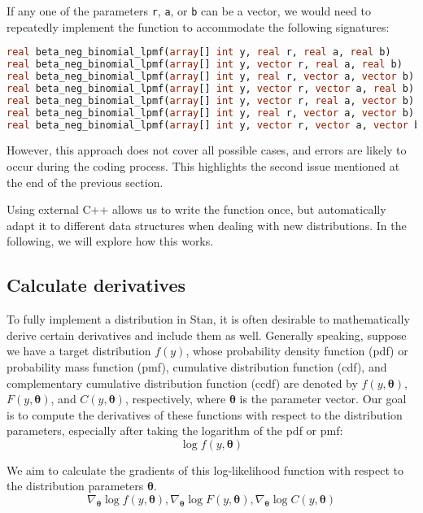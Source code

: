 \documentclass[11pt]{article}
\begin{document}
If any one of the parameters \verb|r|, \verb|a|, or \verb|b| can be a vector, we would need to repeatedly implement the function to accommodate the following signatures:
\begin{lstlisting}[language=Stan, style=lgeneral]
real beta_neg_binomial_lpmf(array[] int y, real r, real a, real b)
real beta_neg_binomial_lpmf(array[] int y, vector r, real a, real b)
real beta_neg_binomial_lpmf(array[] int y, real r, vector a, vector b)
real beta_neg_binomial_lpmf(array[] int y, vector r, vector a, real b)
real beta_neg_binomial_lpmf(array[] int y, vector r, real a, vector b)
real beta_neg_binomial_lpmf(array[] int y, real r, vector a, vector b)
real beta_neg_binomial_lpmf(array[] int y, vector r, vector a, vector b)
\end{lstlisting}
However, this approach does not cover all possible cases, and errors are likely to occur during the coding process. This highlights the second issue mentioned at the end of the previous section.

Using external C++ allows us to write the function once, but automatically adapt it to different data structures when dealing with new distributions. In the following, we will explore how this works.



\subsection{Calculate derivatives}

To fully implement a distribution in Stan, it is often desirable to mathematically derive certain derivatives and include them as well. Generally speaking, suppose we have a target distribution \( f(y) \), whose probability density function (pdf) or probability mass function (pmf), cumulative distribution function (cdf), and complementary cumulative distribution function (ccdf) are denoted by \( f(y, \boldsymbol\theta) \), \( F(y, \boldsymbol\theta) \), and \( C(y, \boldsymbol\theta) \), respectively, where \( \boldsymbol\theta \) is the parameter vector. Our goal is to compute the derivatives of these functions with respect to the distribution parameters, especially after taking the logarithm of the pdf or pmf:
\begin{equation}
\log f(y, \boldsymbol\theta)
\end{equation}


We aim to calculate the gradients of this log-likelihood function with respect to the distribution parameters \( \boldsymbol\theta \).
\begin{equation}
\nabla_{\boldsymbol{\theta}} \log f(y,\boldsymbol\theta), \nabla_{\boldsymbol{\theta}}\log F(y,\boldsymbol\theta), \nabla_{\boldsymbol {\theta}}\log C(y,\boldsymbol\theta)
\end{equation}
\end{document}
